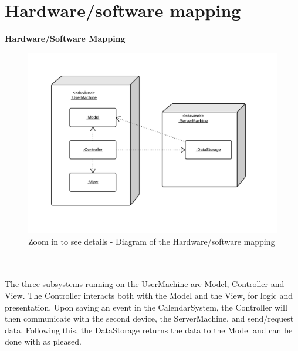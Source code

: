 \section{Hardware/software mapping}
\textbf{Hardware/Software Mapping}\\
\begin{figure}[h!]
	\centering
		\includegraphics[scale=0.4]{HardwareSoftwareMapping}
	\caption{Zoom in to see details - Diagram of the Hardware/software mapping}
  \label{fig:HardwareSoftwareMapping}
\end{figure}\\\\
The three subsystems running on the UserMachine are Model, Controller and View. The Controller interacts both with the Model and the View, for logic and presentation. Upon saving an event in the CalendarSystem, the Controller will then communicate with the second device, the ServerMachine, and send/request data. Following this, the DataStorage returns the data to the Model and can be done with as pleased.